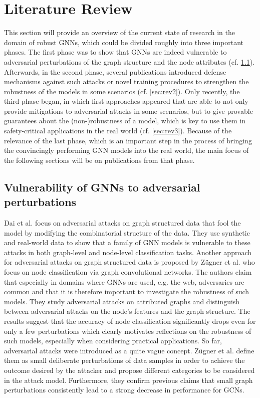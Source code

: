 \documentclass[a4paper,preprint]{sig-alternate}
\begin{document}
\section{Literature Review}
\label{sec:literature}

This section will provide an overview of the current state of research in the domain of robust GNNs, which could be divided
roughly into three important phases.
The first phase was to show that GNNs are indeed vulnerable to adversarial perturbations of the graph structure and the node attributes (cf. \ref{sec:rev1}).
Afterwards, in the second phase, several publications introduced defense mechanisms against such attacks or novel training procedures 
to strengthen the robustness of the models in some scenarios (cf. \ref{sec:rev2}). Only recently, the third phase began, in which first approaches appeared
that are able to not only provide mitigations to adversarial attacks in some scenarios, but to give provable guarantees about the (non-)robustness 
of a model, which is key to use them in safety-critical applications in the real world (cf. \ref{sec:rev3}). Because of the relevance of the last phase, 
which is an important step in the process of bringing the convincingly performing GNN models into the real world, the main focus of the following sections
will be on publications from that phase.

\vfill
\pagebreak

\subsection{Vulnerability of GNNs to adversarial perturbations}
\label{sec:rev1}

Dai et al. \cite{Dai_2018} focus on adversarial attacks on graph structured data that fool the model by modifying the
combinatorial structure of the data. They use synthetic and real-world data to show that a family of GNN models is vulnerable
to these attacks in both graph-level and node-level classification tasks.
Another approach for adversarial attacks on graph structured data is proposed by Zügner et al. \cite{Zuegner_2018} who focus on node classification
via graph convolutional networks.
The authors claim that especially in domains where GNNs are used, e.g. the web, adversaries are common and that it is therefore important
to investigate the robustness of such models. They study adversarial attacks on attributed graphs and distinguish between
adversarial attacks on the node's features and the graph structure. The results suggest that the accuracy of node classification
significantly drops even for only a few perturbations which clearly motivates reflections on the robustness of such models, especially
when considering practical applications.
So far, adversarial attacks were introduced as a quite vague concept. Zügner et al. \cite{zuegner2019adversarial}
define them as small deliberate perturbations of data samples in order to achieve the outcome desired by the attacker
and propose different categories to be considered in the attack model. Furthermore, they confirm previous claims that small graph 
perturbations consistently lead to a strong decrease in performance for GCNs.
\end{document}
